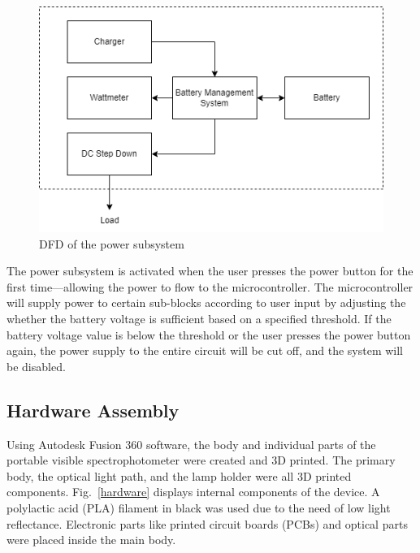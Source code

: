 \documentclass[conference]{IEEEtran}
\begin{document}
    \begin{figure}[htbp]
    \centerline{\includegraphics[scale=0.5]{power-dfd.png}}
    \caption{DFD of the power subsystem}
    \label{power-dfd}
    \end{figure}

The power subsystem is activated when the user presses the power button for the first time—allowing the power to flow to the microcontroller. The microcontroller will supply power to certain sub-blocks according to user input by adjusting the whether the battery voltage is sufficient based on a specified threshold. If the battery voltage value is below the threshold or the user presses the power button again, the power supply to the entire circuit will be cut off, and the system will be disabled.

\subsection{Hardware Assembly}
Using Autodesk Fusion 360 software, the body and individual parts of the portable visible spectrophotometer were created and 3D printed.
The primary body, the optical light path, and the lamp holder were all 3D printed components.
Fig.~\ref{hardware} displays internal components of the device.
A polylactic acid (PLA) filament in black was used due to the need of low light reflectance.
Electronic parts like printed circuit boards (PCBs) and optical parts were placed inside the main body.
\end{document}
